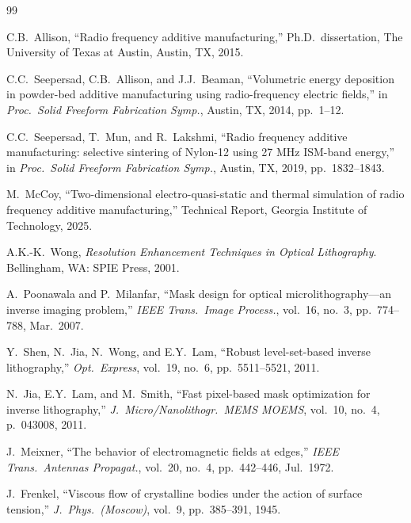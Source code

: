\documentclass[10pt,twocolumn]{article}
\begin{document}
\begin{thebibliography}{99}

C.B.~Allison,
``Radio frequency additive manufacturing,''
Ph.D.\ dissertation, The University of Texas at Austin, Austin, TX,
2015.

C.C.~Seepersad, C.B.~Allison, and J.J.~Beaman,
``Volumetric energy deposition in powder-bed additive manufacturing
using radio-frequency electric fields,''
in \textit{Proc.\ Solid Freeform Fabrication Symp.}, Austin, TX, 2014,
pp.~1--12.

C.C.~Seepersad, T.~Mun, and R.~Lakshmi,
``Radio frequency additive manufacturing: selective sintering of
Nylon-12 using 27 MHz ISM-band energy,''
in \textit{Proc.\ Solid Freeform Fabrication Symp.}, Austin, TX, 2019,
pp.~1832--1843.

M.~McCoy,
``Two-dimensional electro-quasi-static and thermal simulation of
radio frequency additive manufacturing,''
Technical Report, Georgia Institute of Technology, 2025.

A.K.-K.~Wong,
\textit{Resolution Enhancement Techniques in Optical Lithography}.
Bellingham, WA: SPIE Press, 2001.

A.~Poonawala and P.~Milanfar,
``Mask design for optical microlithography---an inverse imaging
problem,''
\textit{IEEE Trans.\ Image Process.}, vol.~16, no.~3, pp.~774--788,
Mar.~2007.

Y.~Shen, N.~Jia, N.~Wong, and E.Y.~Lam,
``Robust level-set-based inverse lithography,''
\textit{Opt.\ Express}, vol.~19, no.~6, pp.~5511--5521, 2011.

N.~Jia, E.Y.~Lam, and M.~Smith,
``Fast pixel-based mask optimization for inverse lithography,''
\textit{J.\ Micro/Nanolithogr.\ MEMS MOEMS}, vol.~10, no.~4,
p.~043008, 2011.

J.~Meixner,
``The behavior of electromagnetic fields at edges,''
\textit{IEEE Trans.\ Antennas Propagat.}, vol.~20, no.~4,
pp.~442--446, Jul.~1972.

J.~Frenkel,
``Viscous flow of crystalline bodies under the action of surface
tension,''
\textit{J.\ Phys.\ (Moscow)}, vol.~9, pp.~385--391, 1945.


\end{thebibliography}
\end{document}
